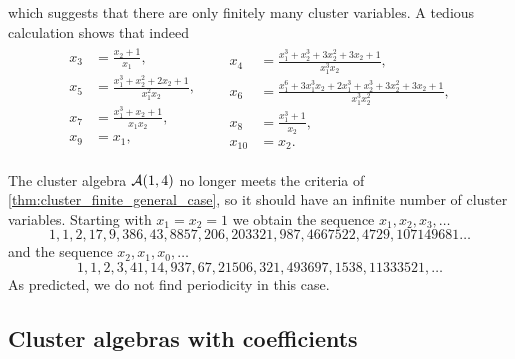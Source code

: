 \begin{example}
\begin{equation*}
	\end{equation*}
	which suggests that there are only finitely many cluster variables. A tedious
	calculation shows that indeed
	\begin{align*}
		\begin{aligned}
			x_{3} & =\frac{x_{2} + 1}{x_{1}},                                     \\
			x_{5} & =\frac{x_{1}^{3} + x_{2}^{2} + 2 x_{2} + 1}{x_{1}^{2} x_{2}}, \\
			x_{7} & =\frac{x_{1}^{3} + x_{2} + 1}{x_{1} x_{2}},                   \\
			x_{9} & =x_{1},                                                       \\
		\end{aligned}
		 &  &
		\begin{aligned}
			x_{4}  & =\frac{x_{1}^{3} + x_{2}^{3} + 3 x_{2}^{2} + 3 x_{2} + 1}{x_{1}^{3} x_{2}},                                       \\
			x_{6}  & =\frac{x_{1}^{6} + 3 x_{1}^{3} x_{2} + 2 x_{1}^{3} + x_{2}^{3} + 3 x_{2}^{2} + 3 x_{2} + 1}{x_{1}^{3} x_{2}^{2}}, \\
			x_{8}  & =\frac{x_{1}^{3} + 1}{x_{2}},                                                                                     \\
			x_{10} & =x_{2}.
		\end{aligned}
	\end{align*}

	The cluster algebra $\mathcal{A}(1,4)$ no longer meets the criteria of
	\cref{thm:cluster_finite_general_case}, so it should have an infinite number of cluster
	variables. Starting with $x_1 = x_2 = 1$ we obtain the sequence $x_1, x_2, x_3, \dots$
	\begin{equation*}
		1,1,2,17,9,386,43,8857,206,203321,987,4667522,4729,107149681\dots
	\end{equation*}
	and the sequence $x_2, x_1, x_0, \dots$
	\begin{equation*}
		1,1,2,3,41,14,937,67,21506,321,493697,1538,11333521,\dots
	\end{equation*}
	As predicted, we do not find periodicity in this case.
\end{example}

\subsection{Cluster algebras with coefficients}\label{sec:cluster_algebras_coefficients}

